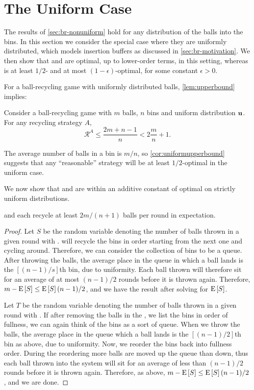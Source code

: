 \section{The Uniform Case}\label{sec:br-uniform}

The results of \cref{sec:br-nonuniform} hold for any distribution of the balls
into the bins. In this section we consider the special case where they are
uniformly distributed, which models insertion buffers as discussed in
\cref{sec:br-motivation}.  We then show that \GG and \FB are optimal, up to
lower-order terms, in this setting, whereas \RB is at least $1/2$- and at most
$(1-\epsilon)$-optimal, for some constant $\epsilon>0$.

For a ball-recycling game with uniformly distributed balls,
\cref{lem:upperbound} implies:
\begin{corollary}\label{cor:uniformupperbound}
	Consider a ball-recycling game with $m$ balls, $n$ bins and uniform
	distribution $\mathbf{u}$. For any recycling strategy $A$, 
	\[\mathcal{R}^A \leq \frac{2m+n-1}{n} < 2\frac{m}{n} + 1.\]
\end{corollary}

The average number of balls in a bin is $m/n$, so \cref{cor:uniformupperbound}
suggests that any ``reasonable'' strategy will be at least $1/2$-optimal in the
uniform case.

We now show that \GG and \FB are within an additive constant of optimal on strictly
uniform distributions.

\begin{lemma}\label{lem:unilowerbound}
	\GG and \FB each recycle at least $2m/(n+1)$ balls per round in
	expectation.
\end{lemma}

\begin{proof}
	Let $S$ be the random variable denoting the number of balls thrown in a
	given round with \GG. \GG will recycle the bins in order starting from the
	next one and cycling around. Therefore, we can consider the collection of
	bins to be a queue. After throwing the balls, the average place in the
	queue in which a ball lands is the $\left[(n-1)/s\right]$th bin, due to
	uniformity. Each ball thrown will therefore sit for an average of at most
	$(n-1)/2$ rounds before it is thrown again. Therefore,
	$m-\mathrm{E}\left[S\right]\leq\mathrm{E}\left[S\right](n-1)/2$, and we have the result after solving for
	$\mathrm{E}\left[S\right]$.

	Let $T$ be the random variable denoting the number of balls thrown in a
	given round with \FB. If after removing the balls in the \FB, we list the
	bins in order of fullness, we can again think of the bins as a sort of
	queue.  When we throw the balls, the average place in the queue which a
	ball lands is the $\left[(n-1)/2\right]$th bin as above, due to uniformity.
	Now, we reorder the bins back into fullness order.  During the reordering
	more balls are moved up the queue than down, thus each ball thrown into the
	system will sit for an average of less than $(n-1)/2$ rounds before it is
	thrown again. Therefore, as above, $m-\mathrm{E}\left[S\right]\leq\mathrm{E}\left[S\right](n-1)/2$, and we are
	done.
\end{proof}

